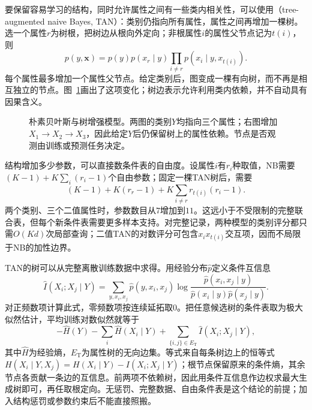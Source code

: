 要保留容易学习的结构，同时允许属性之间有一些类内相关性，可以使用（tree-augmented naive Bayes, TAN）：类别仍指向所有属性，属性之间再增加一棵树。选一个属性$r$为树根，把树边从根向外定向；非根属性$i$的属性父节点记为$t(i)$，则
\begin{equation}
  \label{eq:pgm-static-directed-tan}
  p(y,\bm{x})=
    p(y)p(x_r\mid y)
    \prod_{i\ne r}p(x_i\mid y,x_{t(i)}).
\end{equation}
每个属性最多增加一个属性父节点。给定类别后，图变成一棵有向树，而不再是相互独立的节点。图~\ref{fig:pgm-static-directed-classifiers}画出了这项变化；树边表示允许利用类内依赖，并不自动具有因果含义。

\begin{figure}[htbp]
  \centering
  
  \caption{朴素贝叶斯与树增强模型。两图的类别$Y$均指向三个属性；右图增加$X_1\to X_2\to X_3$，因此给定$Y$后仍保留树上的属性依赖。节点是否观测由训练或预测任务决定。}
  \label{fig:pgm-static-directed-classifiers}
\end{figure}

结构增加多少参数，可以直接数条件表的自由度。设属性$i$有$r_i$种取值，NB需要$(K-1)+K\sum_i(r_i-1)$个自由参数；固定一棵TAN树后，需要
\[
  (K-1)+K(r_r-1)
       +K\sum_{i\ne r}r_{t(i)}(r_i-1).
\]
两个类别、三个二值属性时，参数数目从$7$增加到$11$。这远小于不受限制的完整联合表，但每个新条件表需要更多样本支持。对完整记录，两种模型的类别评分都只需$O(Kd)$次局部查询；二值TAN的对数评分可包含$x_i x_{t(i)}$交互项，因而不局限于NB的加性边界。

TAN的树可以从完整离散训练数据中求得。用经验分布$\widehat p$定义条件互信息
\[
  \widehat I(X_i;X_j\mid Y)=
  \sum_{y,x_i,x_j}\widehat p(y,x_i,x_j)
  \log\frac{\widehat p(x_i,x_j\mid y)}
                 {\widehat p(x_i\mid y)\widehat p(x_j\mid y)}.
\]
对正频数项计算此式，零频数项按连续延拓取$0$。把任意候选树的条件表取为极大似然估计，平均训练对数似然就等于
\begin{equation}
  \label{eq:pgm-static-directed-tan-score}
  -\widehat H(Y)-\sum_i\widehat H(X_i\mid Y)
  +\sum_{\{i,j\}\in E_{\mathrm{T}}}
       \widehat I(X_i;X_j\mid Y),
\end{equation}
其中$\widehat H$为经验熵，$E_{\mathrm{T}}$为属性树的无向边集。等式来自每条树边上的恒等式$H(X_i\mid Y,X_j)=H(X_i\mid Y)-I(X_i;X_j\mid Y)$；根节点保留原来的条件熵，其余节点各贡献一条边的互信息。前两项不依赖树，因此用条件互信息作边权求最大生成树即可，再任取根定向。无惩罚、完整数据、自由条件表是这个结论的前提；加入结构惩罚或参数约束后不能直接照搬。

